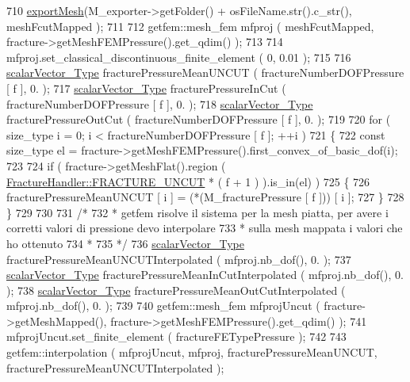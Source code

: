 \begin{DoxyCode}
710         \hyperlink{UsefulFunctions_8h_ae4bd400c144e72bee180107bb41ae72a}{exportMesh}(M\_exporter->getFolder() + osFileName.str().c\_str(), meshFcutMapped );
711 
712         getfem::mesh\_fem mfproj ( meshFcutMapped, fracture->getMeshFEMPressure().get\_qdim() );
713 
714         mfproj.set\_classical\_discontinuous\_finite\_element ( 0, 0.01 );
715 
716         \hyperlink{Core_8h_a4e75b5863535ba1dd79942de2846eff0}{scalarVector\_Type} fracturePressureMeanUNCUT ( fractureNumberDOFPressure [ f ], 0. 
      );
717         \hyperlink{Core_8h_a4e75b5863535ba1dd79942de2846eff0}{scalarVector\_Type} fracturePressureInCut ( fractureNumberDOFPressure [ f ], 0. );
718         \hyperlink{Core_8h_a4e75b5863535ba1dd79942de2846eff0}{scalarVector\_Type} fracturePressureOutCut ( fractureNumberDOFPressure [ f ], 0. );
719 
720         \textcolor{keywordflow}{for} ( size\_type i = 0; i < fractureNumberDOFPressure [ f ]; ++i )
721         \{
722             \textcolor{keyword}{const} size\_type el =  fracture->getMeshFEMPressure().first\_convex\_of\_basic\_dof(i);
723         
724             \textcolor{keywordflow}{if} ( fracture->getMeshFlat().region ( 
      \hyperlink{classFractureHandler_a495ad4fc72d0c47c8f0424842f1153aaaa992cc3ad024a030ecd798dc319c95ac}{FractureHandler::FRACTURE\_UNCUT} * ( f + 1 ) ).is\_in(el) )
725             \{   
726                 fracturePressureMeanUNCUT [ i ] = (*(M\_fracturePressure [ f ])) [ i ];
727             \}
728         \}
729 
730         
731         \textcolor{comment}{/*}
732 \textcolor{comment}{         * getfem risolve il sistema per la mesh piatta, per avere i corretti valori di pressione devo
       interpolare}
733 \textcolor{comment}{         * sulla mesh mappata i valori che ho ottenuto}
734 \textcolor{comment}{         * }
735 \textcolor{comment}{         */}
736         \hyperlink{Core_8h_a4e75b5863535ba1dd79942de2846eff0}{scalarVector\_Type} fracturePressureMeanUNCUTInterpolated ( mfproj.nb\_dof(), 0. );
737         \hyperlink{Core_8h_a4e75b5863535ba1dd79942de2846eff0}{scalarVector\_Type} fracturePressureMeanInCutInterpolated ( mfproj.nb\_dof(), 0. );
738         \hyperlink{Core_8h_a4e75b5863535ba1dd79942de2846eff0}{scalarVector\_Type} fracturePressureMeanOutCutInterpolated ( mfproj.nb\_dof(), 0. );
739 
740         getfem::mesh\_fem mfprojUncut ( fracture->getMeshMapped(), fracture->getMeshFEMPressure().get\_qdim()
      );
741         mfprojUncut.set\_finite\_element ( fractureFETypePressure );
742 
743         getfem::interpolation ( mfprojUncut, mfproj, fracturePressureMeanUNCUT, 
      fracturePressureMeanUNCUTInterpolated );

\end{DoxyCode}

